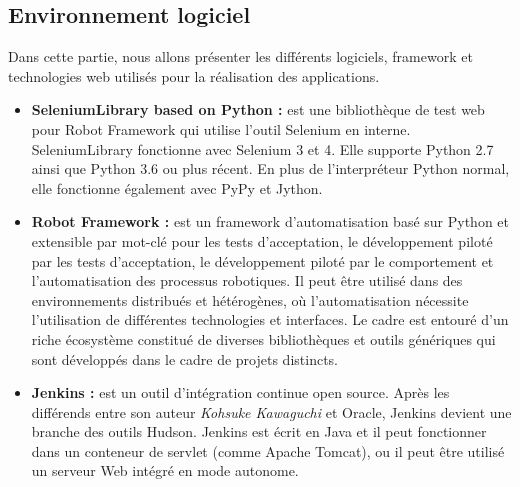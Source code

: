 \subsection[Environnement logiciel]{Environnement logiciel}
Dans cette partie, nous allons présenter les différents logiciels, framework et technologies web utilisés pour la réalisation des applications.
\begin{itemize}
	\item \textbf{SeleniumLibrary based on Python \cite{seleniumlib} :} est une bibliothèque de test web pour Robot Framework qui utilise l'outil Selenium en interne. SeleniumLibrary fonctionne avec Selenium 3 et 4. Elle supporte Python 2.7 ainsi que Python 3.6 ou plus récent. En plus de l'interpréteur Python normal, elle fonctionne également avec PyPy et Jython.

	\item \textbf{Robot Framework \cite{robotframework} :} est un framework d'automatisation basé sur Python et extensible par mot-clé pour les tests d'acceptation, le développement piloté par les tests d'acceptation, le développement piloté par le comportement et l'automatisation des processus robotiques. Il peut être utilisé dans des environnements distribués et hétérogènes, où l'automatisation nécessite l'utilisation de différentes technologies et interfaces. Le cadre est entouré d'un riche écosystème constitué de diverses bibliothèques et outils génériques qui sont développés dans le cadre de projets distincts.

	\item \textbf{Jenkins \cite{jenkins} :} est un outil d'intégration continue open source. Après les différends entre son auteur \textit{Kohsuke Kawaguchi} et Oracle, Jenkins devient une branche des outils Hudson. Jenkins est écrit en Java et il peut fonctionner dans un conteneur de servlet (comme Apache Tomcat), ou il peut être utilisé un serveur Web intégré en mode autonome.


\end{itemize}
